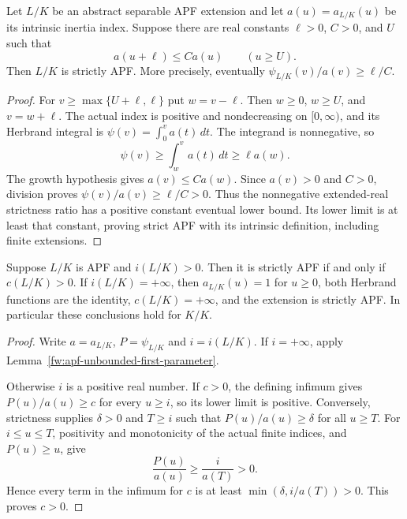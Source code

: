 \begin{lemma}
\label{fw:apf-bounded-index-growth}
\leanok
Let $L/K$ be an abstract separable APF extension and let
$a(u)=a_{L/K}(u)$ be its intrinsic inertia index. Suppose there are
real constants $\ell>0$, $C>0$, and $U$ such that
\[
 a(u+\ell)\leq C a(u)\qquad(u\geq U).
\]
Then $L/K$ is strictly APF. More precisely, eventually
$\psi_{L/K}(v)/a(v)\geq\ell/C$.
\end{lemma}
\begin{proof}
For $v\geq\max\{U+\ell,\ell\}$ put $w=v-\ell$.
Then $w\geq0$, $w\geq U$, and $v=w+\ell$.
The actual index is positive and nondecreasing on $[0,\infty)$,
and its Herbrand integral is $\psi(v)=\int_0^v a(t)\,dt$.
The integrand is nonnegative, so
\[
 \psi(v)\geq\int_w^v a(t)\,dt
       \geq\ell a(w).
\]
The growth hypothesis gives $a(v)\leq C a(w)$.
Since $a(v)>0$ and $C>0$, division proves
$\psi(v)/a(v)\geq\ell/C>0$. Thus the nonnegative extended-real
strictness ratio has a positive constant eventual lower bound.
Its lower limit is at least that constant, proving strict APF
with its intrinsic definition, including finite extensions.
\end{proof}

\begin{proposition}
\label{fw:strict-apf-positive-bound}
\leanok
Suppose $L/K$ is APF and $i(L/K)>0$. Then it is strictly APF if and
only if $c(L/K)>0$. If $i(L/K)=+\infty$, then $a_{L/K}(u)=1$ for
$u\geq0$, both Herbrand functions are the identity, $c(L/K)=+\infty$,
and the extension is strictly APF. In particular these conclusions
hold for $K/K$.
\end{proposition}
\begin{proof}
Write $a=a_{L/K}$, $P=\psi_{L/K}$ and $i=i(L/K)$.
If $i=+\infty$, apply Lemma~\ref{fw:apf-unbounded-first-parameter}.

Otherwise $i$ is a positive real number. If $c>0$, the defining
infimum gives $P(u)/a(u)\geq c$ for every $u\geq i$, so its lower
limit is positive. Conversely, strictness supplies $\delta>0$ and
$T\geq i$ such that $P(u)/a(u)\geq\delta$ for all $u\geq T$.
For $i\leq u\leq T$, positivity and monotonicity of the actual finite
indices, and $P(u)\geq u$, give
\[
 \frac{P(u)}{a(u)}\geq\frac{i}{a(T)}>0.
\]
Hence every term in the infimum for $c$ is at least
$\min(\delta,i/a(T))>0$. This proves $c>0$.
\end{proof}

